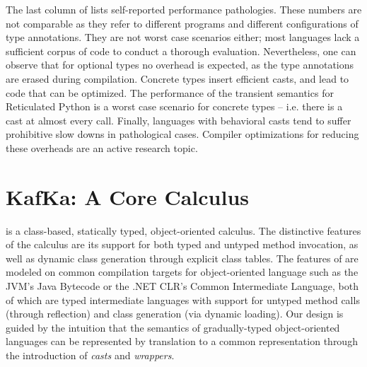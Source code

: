 \documentclass[runnningheads]{tex/llncs}
\begin{document}
The last column of  lists self-reported performance
pathologies.  These numbers are not comparable as they refer to different
programs and different configurations of type annotations. They are not
worst case scenarios either; most languages lack a sufficient corpus of code
to conduct a thorough evaluation.  Nevertheless, one can observe that for
optional types no overhead is expected, as the type annotations are erased
during compilation. Concrete types insert efficient casts, and lead to code
that can be optimized.  The performance of the transient semantics for
Reticulated Python is a worst case scenario for concrete types -- i.e. there
is a cast at almost every call. Finally, languages with behavioral casts
tend to suffer prohibitive slow downs in pathological cases. Compiler
optimizations for reducing these overheads are an active research topic.


\section{KafKa: A Core Calculus}\label{kafkacore}


\noindent \kafka is a class-based, statically typed, object-oriented
calculus. The distinctive features of the calculus are its support for both
typed and untyped method invocation, as well as dynamic class generation
through explicit class tables.  The features of \kafka are modeled on common
compilation targets for object-oriented language such as the JVM's Java
Bytecode or the .NET CLR's Common Intermediate Language, both of which are
typed intermediate languages with support for untyped method calls (through
reflection) and class generation (via dynamic loading). Our design is guided
by the intuition that the semantics of gradually-typed object-oriented
languages can be represented by translation to a common representation
through the introduction of \emph{casts} and \emph{wrappers}.
\end{document}
